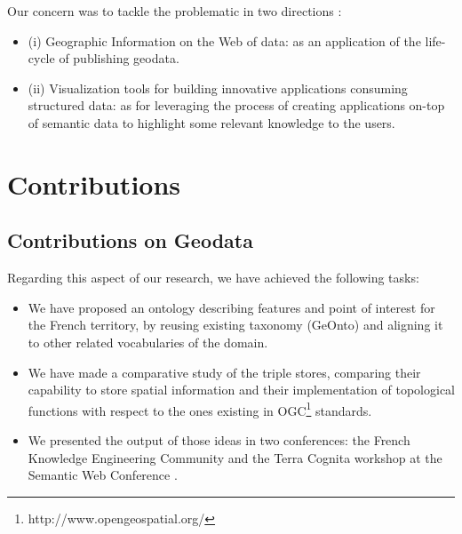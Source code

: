 Our concern was to tackle the problematic in two directions : 
\begin{itemize}
\item (i) Geographic Information on the Web of data: as an application of the life-cycle of publishing geodata.
\item (ii) Visualization tools for building innovative applications consuming structured data: as for leveraging the process of creating applications on-top of semantic data to highlight some relevant knowledge to the users.

\end{itemize}



\section{Contributions}
\label{sec:contributions}

\subsection{Contributions on Geodata}
Regarding this aspect of our research, we have achieved the following tasks:
 \begin{itemize}
  \item We have proposed an ontology describing features and point of interest for the French territory, by reusing existing taxonomy (GeOnto) and aligning it to other related vocabularies of the domain.
 \item We have made a comparative study of the triple stores, comparing their capability to store spatial information and their implementation of topological functions with respect to the ones 
existing in OGC\footnote{http://www.opengeospatial.org/} standards.
 \item We presented the output of those ideas in two conferences: the French Knowledge Engineering Community \cite{atemezing2012a} and the Terra Cognita workshop at the Semantic Web Conference \cite{atemezing2012b}.

\end{itemize}

